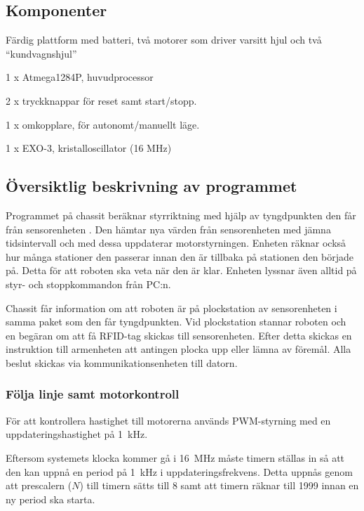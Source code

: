 \subsection{Komponenter}

\begin{packed_itemize}
\item Färdig plattform med batteri, två motorer som driver varsitt hjul och två “kundvagnshjul”
\item 1 x Atmega1284P, huvudprocessor
\item 2 x tryckknappar för reset samt start/stopp.
\item 1 x omkopplare, för autonomt/manuellt läge.
\item 1 x EXO-3, kristalloscillator (16 MHz)
\end{packed_itemize}

\subsection{Översiktlig beskrivning av programmet}

Programmet på chassit beräknar styrriktning med hjälp av tyngdpunkten den får från sensorenheten . Den hämtar nya värden från sensorenheten med jämna tidsintervall och med dessa uppdaterar motorstyrningen. Enheten räknar också hur många stationer den passerar innan den är tillbaka på stationen den började på. Detta för att roboten ska veta när den är klar. Enheten lyssnar även alltid på styr- och stoppkommandon från PC:n.

Chassit får information om att roboten är på plockstation av sensorenheten i samma paket som den får tyngdpunkten. Vid plockstation stannar roboten och en begäran om att få RFID-tag skickas till sensorenheten. Efter detta skickas en instruktion till armenheten att antingen plocka upp eller lämna av föremål. Alla beslut skickas via kommunikationsenheten till datorn.



\subsubsection{Följa linje samt motorkontroll}
\label{följalinje}

För att kontrollera hastighet till motorerna används PWM-styrning med en uppdateringshastighet på 1~kHz.

Eftersom systemets klocka kommer gå i 16~MHz måste timern ställas in så att den kan uppnå en period på 1~kHz i uppdateringsfrekvens. Detta uppnås genom att prescalern ($N$) till timern sätts till 8 samt att timern räknar till 1999 innan en ny period ska starta. 


